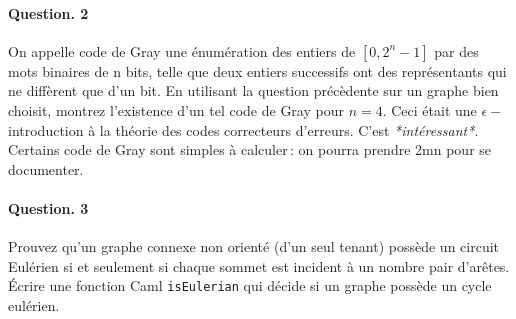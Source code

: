 \documentclass[10pt,a4paper]{article}
\begin{document}
\paragraph{Question. 2\\}
On appelle code de Gray une énumération des entiers de $[0,2^n-1]$ par
des mots binaires de n bits, telle que deux entiers successifs ont des
représentants qui ne diffèrent que d'un bit. En utilisant la question
précèdente sur un graphe bien choisit,  montrez l'existence d'un tel code
de Gray pour $n=4$. Ceci était une $\epsilon-$introduction à la théorie
des codes correcteurs d'erreurs. C'est \emph{*intéressant*}. Certains
code de Gray sont simples à calculer\,: on pourra prendre 2mn pour se
documenter.

\paragraph{Question. 3\\} Prouvez qu'un graphe connexe non orienté (d'un seul tenant) possède un circuit
Eulérien si et seulement si chaque sommet est incident à un nombre pair
d'arêtes. Écrire une fonction Caml \texttt{isEulerian} qui décide si un graphe possède un
cycle eulérien. 
\end{document}
